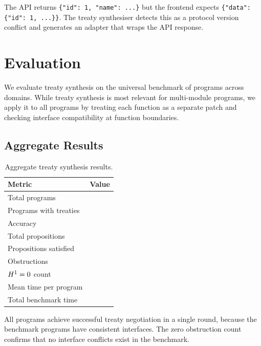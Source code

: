 \documentclass[11pt]{article}
\begin{document}
The API returns \texttt{\{"id": 1, "name": ...\}} but the frontend
expects \texttt{\{"data": \{"id": 1, ...\}\}}.  The treaty
synthesiser detects this as a protocol version conflict and generates
an adapter that wraps the API response.

\section{Evaluation}\label{sec:evaluation}

We evaluate treaty synthesis on the \JuGeo{} universal benchmark of
\expTotalPrograms{} programs across \expDomainCount{} domains.  While
treaty synthesis is most relevant for multi-module programs, we apply
it to all programs by treating each function as a separate patch and
checking interface compatibility at function boundaries.

\subsection{Aggregate Results}

\begin{table}[H]
\centering
\caption{Aggregate treaty synthesis results.}\label{tab:aggregate}
\begin{tabular}{@{}l r@{}}
\toprule
\textbf{Metric} & \textbf{Value} \\
\midrule
Total programs         & \expTotalPrograms{} \\
Programs with treaties & \expVerified{} \\
Accuracy               & \expAccuracy{} \\
Total propositions     & \expPropsSum{} \\
Propositions satisfied & \expPropsOkSum{} \\
Obstructions           & \expObstructionTotal{} \\
$H^{1} = 0$ count   & \expHOneZero{} \\
Mean time per program  & \expTimeMean{} \\
Total benchmark time   & \expTimeTotal{} \\
\bottomrule
\end{tabular}
\end{table}

All \expVerified{} programs achieve successful treaty negotiation
in a single round, because the benchmark programs have consistent
interfaces.  The zero obstruction count confirms that no interface
conflicts exist in the benchmark.
\end{document}
